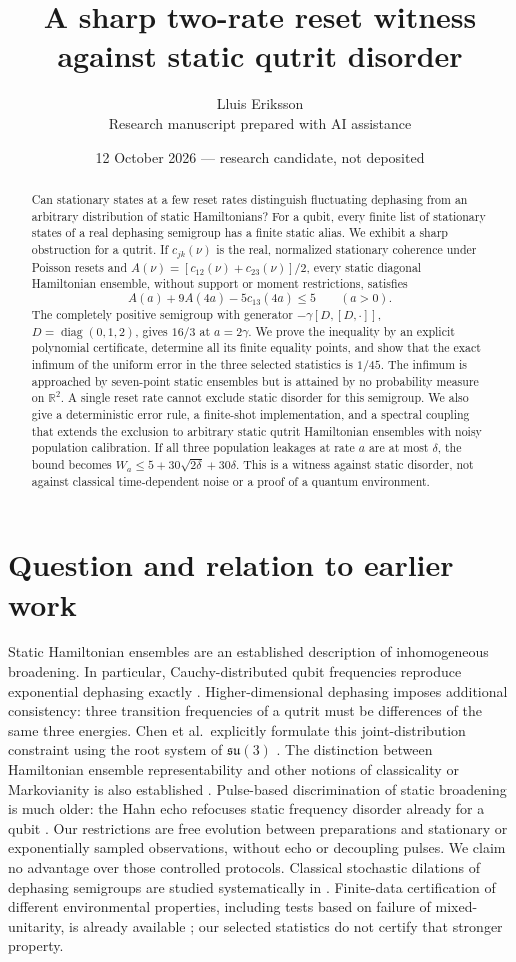 \documentclass[11pt,a4paper]{article}
\title{A sharp two-rate reset witness against static qutrit disorder}
\author{Lluis Eriksson\\\small Research manuscript prepared with AI assistance}
\date{12 October 2026 --- research candidate, not deposited}
\newcommand{\R}{\mathbb R}
\newcommand{\diag}{\operatorname{diag}}
\begin{document}
\maketitle
\begin{abstract}
Can stationary states at a few reset rates distinguish fluctuating
dephasing from an arbitrary distribution of static Hamiltonians?
For a qubit, every finite list of stationary states of a real dephasing
semigroup has a finite static alias. We exhibit a sharp obstruction for
a qutrit. If $c_{jk}(\nu)$ is the real, normalized stationary coherence
under Poisson resets and $A(\nu)=[c_{12}(\nu)+c_{23}(\nu)]/2$, every
static diagonal Hamiltonian ensemble, without support or moment
restrictions, satisfies
\[
 A(a)+9A(4a)-5c_{13}(4a)\leq5\qquad(a>0).
\]
The completely positive semigroup with generator
$-\gamma[D,[D,\cdot]]$, $D=\diag(0,1,2)$, gives $16/3$ at
$a=2\gamma$. We prove the inequality by an explicit polynomial
certificate, determine all its finite equality points, and show that the
exact infimum of the uniform error in the three selected statistics is
$1/45$. The infimum is approached by seven-point static ensembles but
is attained by no probability measure on $\R^2$. A single reset rate
cannot exclude static disorder for this semigroup. We also give a
deterministic error rule, a finite-shot implementation, and a spectral
coupling that extends the exclusion to arbitrary static qutrit Hamiltonian
ensembles with noisy population calibration. If all three population
leakages at rate $a$ are at most $\delta$, the bound becomes
$W_a\leq5+30\sqrt{2\delta}+30\delta$. This is a witness against static
disorder, not against classical time-dependent noise or a proof of a
quantum environment.
\end{abstract}

\section{Question and relation to earlier work}
Static Hamiltonian ensembles are an established description of
inhomogeneous broadening. In particular, Cauchy-distributed qubit
frequencies reproduce exponential dephasing exactly
\cite{kropf,chen2018}. Higher-dimensional dephasing imposes additional
consistency: three transition frequencies of a qutrit must be
differences of the same three energies. Chen et al.\ explicitly formulate
this joint-distribution constraint using the root system of
$\mathfrak{su}(3)$ \cite{chen2019}. The distinction between Hamiltonian
ensemble representability and other notions of classicality or
Markovianity is also established \cite{chen2021}.
Pulse-based discrimination of static broadening is much older: the Hahn
echo refocuses static frequency disorder already for a qubit \cite{hahn}.
Our restrictions are free evolution between preparations and stationary
or exponentially sampled observations, without echo or decoupling pulses.
We claim no advantage over those controlled protocols.
Classical stochastic dilations of dephasing semigroups are studied
systematically in \cite{kummerer,fagnola}. Finite-data certification of different
environmental properties, including tests based on failure of
mixed-unitarity, is already available \cite{lin}; our selected statistics
do not certify that stronger property.
\end{document}
